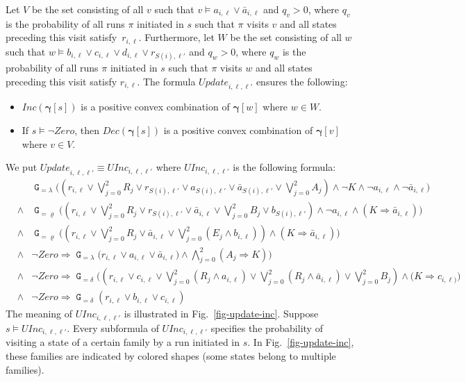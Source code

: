 \documentclass[a4paper,UKenglish,cleveref, autoref, thm-restate]{lipics-v2021}
\newcommand{\Zero}{\mathit{Zero}}
\newcommand{\INC}{\mathit{Inc}}
\newcommand{\DEC}{\mathit{Dec}}
\renewcommand{\vec}[1]{\pmb{#1}}
\newcommand{\Update}{\textit{Update}}
\newcommand{\UInc}{\textit{UInc}}
\newcommand{\cv}{\vec{\gamma}}
\newcommand*{\opg}{\operatorname{\pmb{\mathtt{G}}}}
\begin{document}
Let $V$ be the set consisting of all $v$ such that $v \models a_{i,\ell} \vee \bar{a}_{i,\ell}$ and $q_v > 0$, where $q_v$ is the probability of all runs $\pi$ initiated in $s$ such that $\pi$ visits $v$ and all states preceding this visit satisfy~$r_{i,\ell}$. Furthermore, let $W$ be the set consisting of all $w$ such that \mbox{$w \models b_{i,\ell} \vee c_{i,\ell} \vee d_{i,\ell} \vee r_{S(i),\ell'}$} and $q_w > 0$, where $q_w$ is the probability of all runs $\pi$ initiated in $s$ such that $\pi$ visits $w$ and all states preceding this visit satisfy $r_{i,\ell}$.
The formula $\Update_{i,\ell,\ell'}$ ensures the following:
\begin{itemize}
    \item $\INC(\cv[s])$ is a positive convex combination of $\cv[w]$ where $w \in W$.
    \item If $s \models \neg\Zero$, then $\DEC(\cv[s])$ is a positive convex combination of $\cv[v]$ where $v \in V$.
\end{itemize}
We put $\Update_{i,\ell,\ell'} \equiv \UInc_{i,\ell,\ell'}$ where $\UInc_{i,\ell,\ell'}$ is the following formula:
{\small \begin{eqnarray}
     &  & \textstyle 
       \opg_{=\lambda} \big( (r_{i,\ell} \vee \bigvee_{j=0}^2 R_j \vee r_{S(i),\ell'} \vee
              a_{S(i),\ell'} \vee \bar{a}_{S(i),\ell'} \vee \bigvee_{j=0}^2 A_j)  \wedge \neg K \wedge \neg a_{i,\ell} \wedge \neg\bar{a}_{i,\ell} \big)\label{incsub-one}\\
    & \wedge & \textstyle 
       \opg_{=\varrho}  \big( (r_{i,\ell} \vee \bigvee_{j=0}^2 R_j \vee r_{S(i),\ell'} \vee
       \bar{a}_{i,\ell} \vee \bigvee_{j=0}^2 B_j \vee b_{S(i),\ell'})  \wedge \neg a_{i,\ell} \wedge (K \Rightarrow \bar{a}_{i,\ell})\big)\label{incsub-two}\\
    & \wedge & \textstyle 
       \opg_{=\varrho} \big( (r_{i,\ell} \vee \bigvee_{j=0}^2 R_j \vee  \bar{a}_{i,\ell} \vee
       \bigvee_{j=0}^2 (E_j {\wedge} b_{i,\ell}))   \wedge (K \Rightarrow \bar{a}_{i,\ell}) \big)\label{incsub-three}\\
& \wedge & \textstyle
       \neg\Zero \Rightarrow 
           \opg_{=\lambda} \big( r_{i,\ell} \vee a_{i,\ell}
              \vee \bar{a}_{i,\ell}) \wedge \bigwedge_{j=0}^2 (A_j \Rightarrow K) \big)\label{incsub-four}\\
    & \wedge &\textstyle
      \neg\Zero \Rightarrow 
       \opg_{=\delta}\big( (r_{i,\ell} \vee c_{i,\ell} \vee \bigvee_{j=0}^2 (R_j {\wedge} a_{i,\ell})
       \vee \bigvee_{j=0}^2 (R_j {\wedge} \bar{a}_{i,\ell}) \vee \bigvee_{j=0}^2 B_j) \wedge (K \Rightarrow c_{i,\ell)} \big)\label{incsub-five}\\
    & \wedge &\textstyle
       \neg\Zero \Rightarrow   
       \opg_{=\delta}(r_{i,\ell} \vee b_{i,\ell} \vee c_{i,\ell})\label{incsub-six}     
\end{eqnarray}}The meaning of $\UInc_{i,\ell,\ell'}$ is illustrated in Fig.~\ref{fig-update-inc}.  Suppose $s \models \UInc_{i,\ell,\ell'}$. Every subformula of $\UInc_{i,\ell,\ell'}$ specifies the probability of visiting a state of a certain family by a run initiated in $s$.  In Fig.~\ref{fig-update-inc}, these families are indicated by colored shapes (some states belong to multiple families). 
\end{document}
